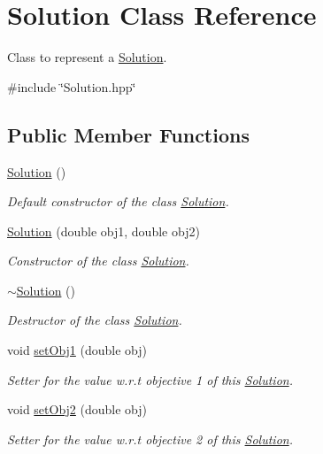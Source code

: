 \hypertarget{classSolution}{\section{\-Solution \-Class \-Reference}
\label{classSolution}
}


\-Class to represent a {\ttfamily \hyperlink{classSolution}{\-Solution}}.  




{\ttfamily \#include \char`\"{}\-Solution.\-hpp\char`\"{}}

\subsection*{\-Public \-Member \-Functions}
\begin{DoxyCompactItemize}
\item 
\hyperlink{classSolution_ab55bd4b023d596ce11aaf737b9a6123b}{\-Solution} ()
\begin{DoxyCompactList}\small\item\em \-Default constructor of the class {\ttfamily \hyperlink{classSolution}{\-Solution}}. \end{DoxyCompactList}\item 
\hyperlink{classSolution_a8e9e32a495a55d236add3b591c23e583}{\-Solution} (double obj1, double obj2)
\begin{DoxyCompactList}\small\item\em \-Constructor of the class {\ttfamily \hyperlink{classSolution}{\-Solution}}. \end{DoxyCompactList}\item 
\hyperlink{classSolution_a5d245f7409aacf6ace5e965b7879a580}{$\sim$\-Solution} ()
\begin{DoxyCompactList}\small\item\em \-Destructor of the class {\ttfamily \hyperlink{classSolution}{\-Solution}}. \end{DoxyCompactList}\item 
void \hyperlink{classSolution_a22c29ab88071615135e155fdf43126d8}{set\-Obj1} (double obj)
\begin{DoxyCompactList}\small\item\em \-Setter for the value w.\-r.\-t objective 1 of this {\ttfamily \hyperlink{classSolution}{\-Solution}}. \end{DoxyCompactList}\item 
void \hyperlink{classSolution_a3e9e69ac25341ad5249ee7dc49329b92}{set\-Obj2} (double obj)
\begin{DoxyCompactList}\small\item\em \-Setter for the value w.\-r.\-t objective 2 of this {\ttfamily \hyperlink{classSolution}{\-Solution}}. \end{DoxyCompactList}\item 

\end{DoxyCompactItemize}
